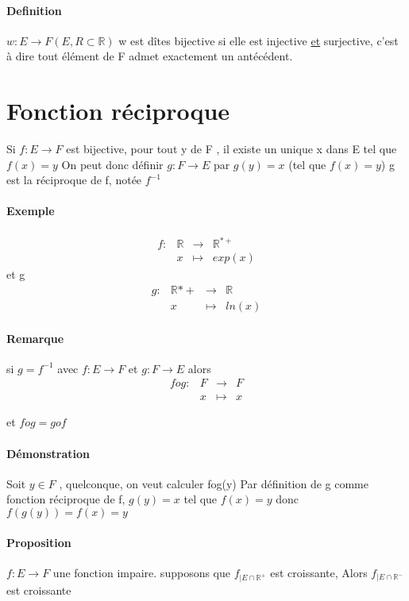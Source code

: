 \paragraph{Definition} $w : E \rightarrow F (E,R \subset \mathbb{R})$
w est dîtes bijective si elle est injective \ul{et} surjective, c'est à dire tout élément de F admet exactement  un antécédent.

\section{Fonction réciproque}
Si $f:E\rightarrow F$ est bijective, pour tout y de F , il existe un unique x dans E tel que $f(x) = y$
On peut donc définir $g:F\rightarrow E$ par $g(y) = x$ (tel que $f(x)=y$)
g est la réciproque de f, notée $f^{-1}$

\paragraph{Exemple}
\begin{align*}
	f: & \mathbb{R} & \rightarrow & \mathbb{R}^{*+} \\
	   & x & \mapsto & exp(x)
\end{align*}
 et g 
\begin{align*}
	g: & \mathbb{R}{*+} & \rightarrow & \mathbb{R} \\
	   & x & \mapsto & ln(x)
\end{align*}

\paragraph{Remarque} si $g=f^{-1}$ avec $f: E \rightarrow F$ et $g: F \rightarrow E$ alors
\begin{align*}
	fog: & F & \rightarrow & F \\
	   & x & \mapsto & x
\end{align*}

et $fog = gof$

\paragraph{Démonstration} 
Soit $y \in F$ , quelconque, on veut calculer fog(y)
Par définition de g comme fonction réciproque de f, $g(y) = x$ tel que $f(x) = y$ donc $f(g(y)) = f(x) = y$

\paragraph{Proposition} $f:E\rightarrow F$ une fonction impaire. supposons que $f_{| E \cap \mathbb{R}^+}$ est croissante, Alors $f_{|E \cap \mathbb{R}^-}$ est croissante

